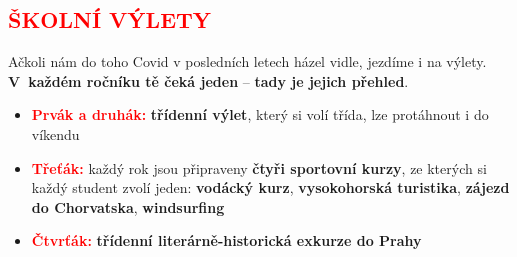 \documentclass{article}
\newcommand{\podnadpis}[1]{
  \subsection*{\textcolor{red}{#1}}
}
\begin{document}
\newpage

\podnadpis{ŠKOLNÍ VÝLETY}
Ačkoli nám do toho Covid v posledních letech házel vidle, jezdíme i na výlety.
\textbf{V~každém ročníku tě čeká jeden} -- \textbf{tady je jejich přehled}.

\begin{itemize}[leftmargin=10pt]
  \item \textcolor{red}{\textbf{Prvák a druhák:}} \textbf{třídenní výlet}, který si volí třída, lze protáhnout i do víkendu
  \item \textcolor{red}{\textbf{Třeťák:}} každý rok jsou připraveny \textbf{čtyři sportovní kurzy}, ze kterých si každý student zvolí jeden: \textbf{vodácký kurz}, \textbf{vysokohorská turistika}, \textbf{zájezd do Chorvatska}, \textbf{windsurfing}
  \item \textcolor{red}{\textbf{Čtvrťák:}} \textbf{třídenní literárně-historická exkurze do Prahy}
\end{itemize}
\end{document}
